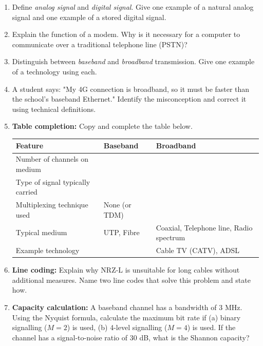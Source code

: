 \documentclass[11pt]{article}
\begin{document}
\begin{exercice}
\begin{enumerate}
    \item Define \emph{analog signal} and \emph{digital signal}. Give one example of a natural analog signal and one example of a stored digital signal.
    \item Explain the function of a modem. Why is it necessary for a computer to communicate over a traditional telephone line (PSTN)?
    \item Distinguish between \emph{baseband} and \emph{broadband} transmission. Give one example of a technology using each.
    \item A student says: "My 4G connection is broadband, so it must be faster than the school's baseband Ethernet." Identify the misconception and correct it using technical definitions.
    \item \textbf{Table completion:} Copy and complete the table below.
    \begin{center}
    \begin{tabularx}{\linewidth}{|l|X|X|}
    \hline
    \rowcolor{popblueL}
    \textbf{Feature} & \textbf{Baseband} & \textbf{Broadband} \\
    \hline
    Number of channels on medium & & \\
    \hline
    Type of signal typically carried & & \\
    \hline
    Multiplexing technique used & None (or TDM) & \\
    \hline
    Typical medium & UTP, Fibre & Coaxial, Telephone line, Radio spectrum \\
    \hline
    Example technology & & Cable TV (CATV), ADSL \\
    \hline
    \end{tabularx}
    \end{center}
    \item \textbf{Line coding:} Explain why NRZ-L is unsuitable for long cables without additional measures. Name two line codes that solve this problem and state how.
    \item \textbf{Capacity calculation:} A baseband channel has a bandwidth of 3 MHz. Using the Nyquist formula, calculate the maximum bit rate if (a) binary signalling ($M=2$) is used, (b) 4-level signalling ($M=4$) is used. If the channel has a signal-to-noise ratio of 30 dB, what is the Shannon capacity?
\end{enumerate}
\end{exercice}
\end{document}
